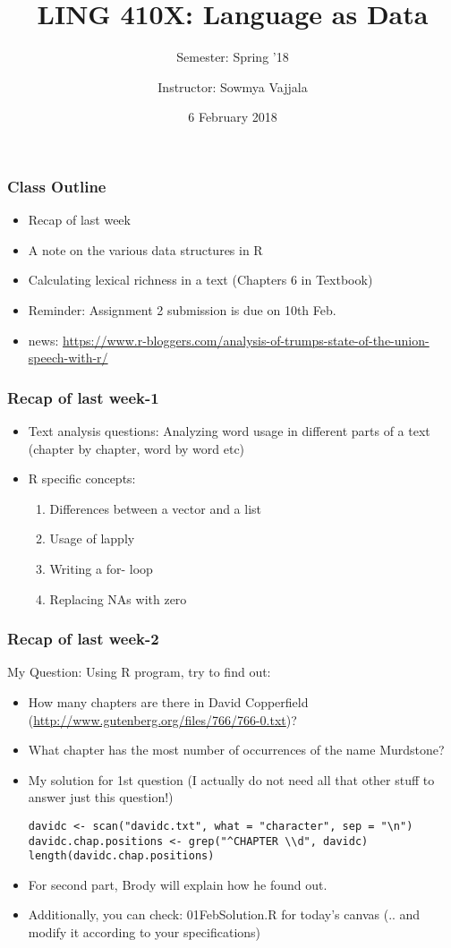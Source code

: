 \documentclass{beamer}
\author[Sowmya Vajjala]{Instructor: Sowmya Vajjala}
\title[LING 410X]{LING 410X: Language as Data}
\subtitle{Semester: Spring '18}
\date{6 February 2018}
\institute{Iowa State University, USA}
\begin{document}
\begin{frame}\titlepage
\end{frame}


\begin{frame}
\frametitle{Class Outline}
\begin{itemize}
\item Recap of last week
\item A note on the various data structures in R
\item Calculating lexical richness in a text (Chapters 6 in Textbook)
\item Reminder: Assignment 2 submission is due on 10th Feb.
\item news: \url{https://www.r-bloggers.com/analysis-of-trumps-state-of-the-union-speech-with-r/}
\end{itemize}
\end{frame}

\begin{frame}
\frametitle{Recap of last week-1}
\begin{itemize}
\item Text analysis questions: Analyzing word usage in different parts of a text (chapter by chapter, word by word etc)
\item R specific concepts:
\begin{enumerate}
\item Differences between a vector and a list
\item Usage of lapply 
\item Writing a for- loop
\item Replacing NAs with zero
\end{enumerate}
\end{itemize}
\end{frame}

\begin{frame}[fragile]
\frametitle{Recap of last week-2}
My Question: Using R program, try to find out:
\begin{itemize}
\item How many chapters are there in David Copperfield (\url{http://www.gutenberg.org/files/766/766-0.txt})? 
\item What chapter has the most number of occurrences of the name Murdstone? \pause
\item My solution for 1st question (I actually do not need all that other stuff to answer just this question!)
\scriptsize
\begin{verbatim}
davidc <- scan("davidc.txt", what = "character", sep = "\n")
davidc.chap.positions <- grep("^CHAPTER \\d", davidc)
length(davidc.chap.positions)
\end{verbatim} \small
\item For second part, Brody will explain how he found out. 
\item Additionally, you can check: 01FebSolution.R for today's canvas (.. and modify it according to your specifications)
\end{itemize}
\end{frame}
\end{document}
